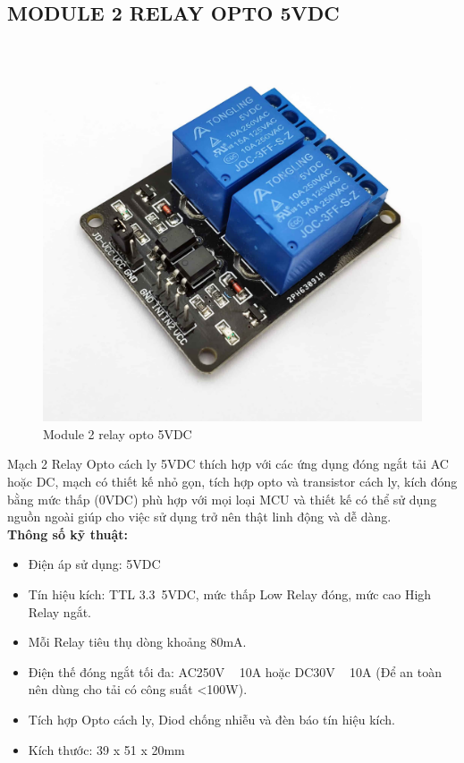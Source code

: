 \subsection{MODULE 2 RELAY OPTO 5VDC}
\begin{figure}[H]
	\centering
	\includegraphics[scale=.1]{Chapter 3/image chapter 3/2relay.jpg}
	\caption[Module 2 relay opto 5VDC]{Module 2 relay opto 5VDC}
	\label{hinh39}
\end{figure}
Mạch 2 Relay Opto cách ly 5VDC thích hợp với các ứng dụng đóng ngắt tải AC hoặc DC, mạch có thiết kế nhỏ gọn, tích hợp opto và transistor cách ly, kích đóng bằng mức thấp (0VDC) phù hợp với mọi loại MCU và thiết kế có thể sử dụng nguồn ngoài giúp cho việc sử dụng trở nên thật linh động và dễ dàng.\\
\indent \textbf{Thông số kỹ thuật:}
\begin{itemize}
	\item Điện áp sử dụng: 5VDC
	\item Tín hiệu kích: TTL 3.3~5VDC, mức thấp Low Relay đóng, mức cao High Relay ngắt.
	\item Mỗi Relay tiêu thụ dòng khoảng 80mA.
	\item Điện thế đóng ngắt tối đa: AC250V ~ 10A hoặc DC30V ~ 10A (Để an toàn nên dùng cho tải có công suất <100W).
	\item Tích hợp Opto cách ly, Diod chống nhiễu và đèn báo tín hiệu kích.
	\item Kích thước: 39 x 51 x 20mm
\end{itemize}
